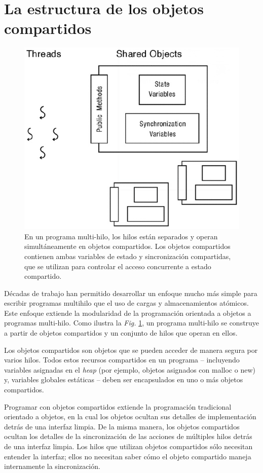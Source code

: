 \documentclass[10pt]{book}
\begin{document}
\section{La estructura de los objetos compartidos}
\begin{figure}[tbhp]
\centerline{\includegraphics[scale=0.45]{img/fig0501}}
\caption{En un programa multi-hilo, los hilos están separados y operan simultáneamente en objetos compartidos. Los objetos compartidos contienen ambas variables de estado y sincronización compartidas, que se utilizan para controlar el acceso concurrente a estado compartido.}
\label{fig0501}
\end{figure}

Décadas de trabajo han permitido desarrollar un enfoque mucho más simple para escribir programas multihilo que el uso de cargas y almacenamientos atómicos. Este enfoque extiende la modularidad de la programación orientada a objetos a programas multi-hilo. Como ilustra la \textit{Fig.} \ref{fig0501}, un programa multi-hilo se construye a partir de objetos compartidos y un conjunto de hilos que operan en ellos.

Los objetos compartidos son objetos que se pueden acceder de manera segura por varios hilos. Todos estos recursos compartidos en un programa -- incluyendo variables asignadas en el \textit{heap} (por ejemplo, objetos asignados con {\mf malloc} o {\mf new}) y, variables globales estáticas -- deben ser encapsulados en uno o más objetos compartidos.

Programar con objetos compartidos extiende la programación tradicional orientado a objetos, en la cual los objetos ocultan sus detalles de implementación detrás de una interfaz limpia. De la misma manera, los objetos compartidos ocultan los detalles de la sincronización de las acciones de múltiples hilos detrás de una interfaz limpia. Los hilos que utilizan objetos compartidos sólo necesitan entender la interfaz; ellos no necesitan saber cómo el objeto compartido maneja internamente la sincronización.
\end{document}
